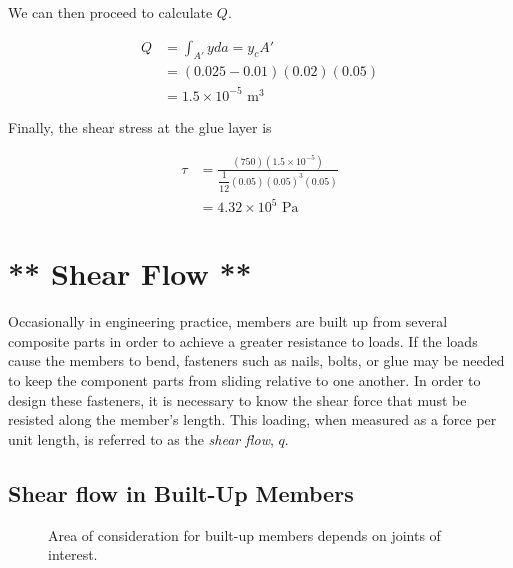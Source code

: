 \documentclass[
fontsize=10pt,
a4paper,
twosides=false,
open=any,
svgnames,
]{kaobook} %
\begin{document}
\begin{example}
  We can then proceed to calculate $Q$.

  \begin{align*}
    Q &= \int_{A'} yda = y_cA' \\
      &= (0.025 - 0.01)(0.02)(0.05) \\
      &= 1.5 \times 10^{-5} \text{ m}^3
  \end{align*}

  Finally, the shear stress at the glue layer is

  \begin{align*}
    \tau &= \frac{(750)(1.5 \times 10^{-5})}{\dfrac{1}{12}(0.05)(0.05)^3(0.05)} \\ 
         &= 4.32 \times 10^5 \text{ Pa}
  \end{align*}
\end{example}
	
\section{** Shear Flow **}

Occasionally in engineering practice, members are built up from several composite parts in order to achieve a greater resistance to loads. If the loads cause the members to bend, fasteners such as nails, bolts, or glue may be needed to keep the component parts from sliding relative to one another. In order to design these fasteners, it is necessary to know the shear force that must be resisted along the member’s length. This loading, when measured as a force per unit length, is referred to as the \emph{shear flow}, $q$.

\subsection{Shear flow in Built-Up Members}

\begin{figure}[h]
  \centering
  \caption{Area of consideration for built-up members depends on joints of interest.}
  \end{figure}
\end{document}
